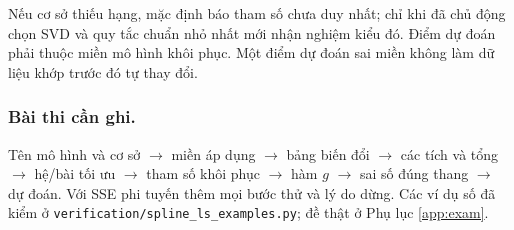 Nếu cơ sở thiếu hạng, mặc định báo tham số chưa duy nhất; chỉ khi đã chủ động chọn SVD và quy tắc chuẩn nhỏ nhất mới nhận nghiệm kiểu đó. Điểm dự đoán phải thuộc miền mô hình khôi phục. Một điểm dự đoán sai miền không làm dữ liệu khớp trước đó tự thay đổi.

\subsubsection*{Bài thi cần ghi.} Tên mô hình và cơ sở $\to$ miền áp dụng $\to$ bảng biến đổi $\to$ các tích và tổng $\to$ hệ/bài tối ưu $\to$ tham số khôi phục $\to$ hàm $g$ $\to$ sai số đúng thang $\to$ dự đoán. Với SSE phi tuyến thêm mọi bước thử và lý do dừng. Các ví dụ số đã kiểm ở \texttt{verification/spline\_ls\_examples.py}; đề thật ở Phụ lục \ref{app:exam}.
